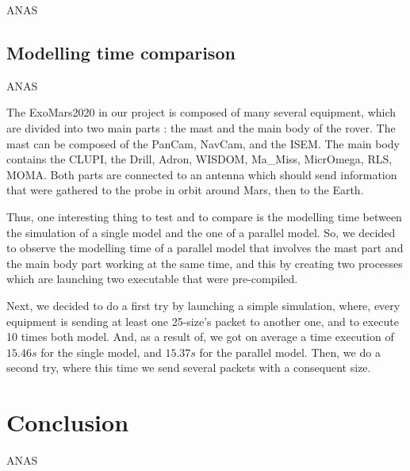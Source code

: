 \documentclass[12pt,a4paper]{article}
\begin{document}
ANAS

\subsection{Modelling time comparison}

ANAS

The ExoMars2020 in our project is composed of many several equipment, which are divided into two main parts : the mast and the main body of the rover. The mast can be composed of the PanCam, NavCam, and the ISEM. The main body contains the CLUPI, the Drill, Adron, WISDOM, Ma\_Miss, MicrOmega, RLS, MOMA. Both parts are connected to an antenna which should send information that were gathered to the probe in orbit around Mars, then to the Earth.\smallbreak

Thus, one interesting thing to test and to compare is the modelling time between the simulation of a single model and the one of a parallel model. So, we decided to observe the modelling time of a parallel model that involves the mast part and the main body part working at the same time, and this by creating two processes which are launching two executable that were pre-compiled.\smallbreak

Next, we decided to do a first try by launching a simple simulation, where, every equipment is sending at least one 25-size's packet to another one, and to execute 10 times both model. And, as a result of, we got on average a time execution of $15.46 s$ for the single model, and $15.37 s$ for the parallel model. Then, we do a second try, where this time we send several packets with a consequent size.\smallbreak

\pagebreak

\section{Conclusion}

ANAS

\pagebreak
\nocite{*}


\end{document}
